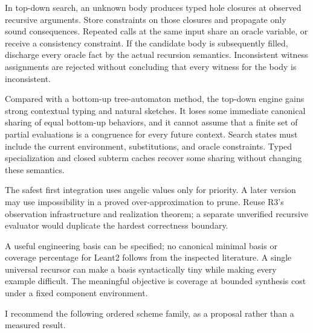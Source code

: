 In top-down search, an unknown body produces typed hole closures at observed recursive arguments. Store constraints on those closures and propagate only sound consequences. Repeated calls at the same input share an oracle variable, or receive a consistency constraint. If the candidate body is subsequently filled, discharge every oracle fact by the actual recursion semantics. Inconsistent witness assignments are rejected without concluding that every witness for the body is inconsistent.

Compared with a bottom-up tree-automaton method, the top-down engine gains strong contextual typing and natural sketches. It loses some immediate canonical sharing of equal bottom-up behaviors, and it cannot assume that a finite set of partial evaluations is a congruence for every future context. Search states must include the current environment, substitutions, and oracle constraints. Typed specialization and closed subterm caches recover some sharing without changing these semantics.

The safest first integration uses angelic values only for priority. A later version may use impossibility in a proved over-approximation to prune. Reuse R3's observation infrastructure and realization theorem; a separate unverified recursive evaluator would duplicate the hardest correctness boundary.

\ans A useful engineering basis can be specified; no canonical minimal basis or coverage percentage for Leant2 follows from the inspected literature. A single universal recursor can make a basis syntactically tiny while making every example difficult. The meaningful objective is coverage at bounded synthesis cost under a fixed component environment.

I recommend the following ordered scheme family, as a proposal rather than a measured result.

